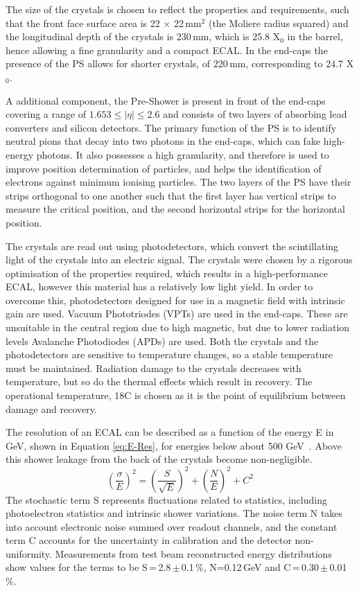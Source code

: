  The size of the crystals is chosen to reflect the properties and requirements, such that the front face surface area is 22 $\times$ 22\,mm$^{2}$ (the Moliere radius squared) and the longitudinal depth of the crystals is 230\,mm, which is 25.8 X$_{0}$ in the barrel, hence allowing a fine granularity and a compact ECAL. In the end-caps the presence of the PS allows for shorter crystals, of 220\,mm, corresponding to 24.7 X$_{0}$.

A additional component, the Pre-Shower is present in front of the end-caps covering a range of $1.653\leq |\eta|\leq2.6$ and consists of two layers of absorbing lead converters and silicon detectors. The primary function of the PS is to identify neutral pions that decay into two photons in the end-caps, which can fake high-energy photons. It also possesses a high granularity, and therefore is used to improve position determination of particles, and helps the identification of electrons against minimum ionising particles. The two layers of the PS have their strips orthogonal to one another such that the first layer has vertical strips to measure the critical position, and the second horizontal strips for the horizontal position. 

The crystals are read out using photodetectors, which convert the scintillating light of the crystals into an electric signal. The crystals were chosen by a rigorous optimisation of the properties required, which results in a high-performance ECAL, however this material has a relatively low light yield. In order to overcome this, photodetectors designed for use in a magnetic field with intrinsic gain are used. Vacuum Phototriodes  (VPTs) are used in the end-caps. These are unsuitable in the central region due to high magnetic, but due to lower radiation levels Avalanche Photodiodes (APDs) are used. Both the crystals and the photodetectors are sensitive to temperature changes, so a stable temperature must be maintained. Radiation damage to the crystals decreases with temperature, but so do the thermal effects which result in recovery. The operational temperature, 18C is chosen as it is the point of equilibrium between damage and recovery.


The resolution of an ECAL can be described as a function of the energy E in GeV, shown in Equation \ref{eq:E-Res}, for energies below about 500 GeV~\cite{PDG}. Above this shower leakage from the back of the crystals become non-negligible. 
\begin{equation}
\left(\frac{\sigma}{E}\right)^2 = \left(\frac{S}{\sqrt{E}}\right)^2 + \left(\frac{N}{E}\right)^2 + C^2
\label{eq:E-Res}
\end{equation}
The stochastic term S represents fluctuations related to statistics, including photoelectron statistics and intrinsic shower variations. The noise term N takes into account electronic noise summed over readout channels, and the constant term C accounts for the uncertainty in calibration and the detector non-uniformity. Measurements from test beam reconstructed energy distributions show values for the terms to be S\,=\,2.8\,$\pm$\,0.1\,\%, N=0.12\,GeV and C\,=\,0.30\,$\pm$\,0.01\,\%. 


